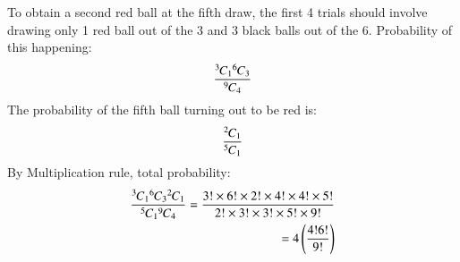  To obtain a second red ball at the fifth draw, the first 4 trials should involve drawing only 1 red ball out of the 3 and 3 black balls out of the 6. Probability of this happening:
 \begin{align}
  \frac{{{}^{3}\mkern-1muC_{1}}{{}^{6}\mkern-1muC_{3}}}{{{}^{9}\mkern-1muC_{4}}}
     \end{align}
The probability of the fifth ball turning out to be red is:
\begin{align}
    \frac{{{}^{2}\mkern-1muC_{1}}}{{{}^{5}\mkern-1muC_{1}}}
\end{align}
By Multiplication rule, total probability:
\begin{align}
    \frac{{{}^{3}\mkern-1muC_{1}}{{}^{6}\mkern-1muC_{3}}{{}^{2}\mkern-1muC_{1}}}{{{}^{5}\mkern-1muC_{1}}{{}^{9}\mkern-1muC_{4}}}
    = \frac{3!\times 6!\times2!\times4!\times4!\times5!}{2!\times3!\times3!\times5!\times9!}\\ 
    =4\left(\frac{4!6!}{9!}\right)
\end{align}
